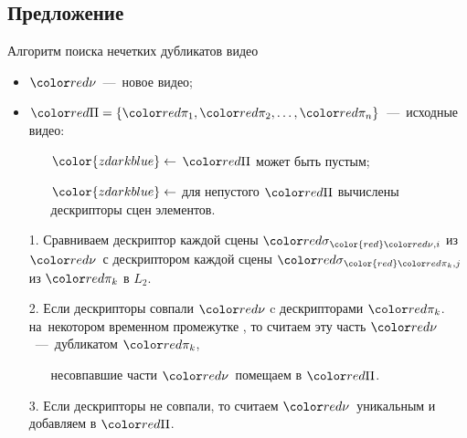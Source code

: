 
\subsection{Предложение}

\begin{frame}{Алгоритм поиска нечетких дубликатов видео}
    \begin{itemize} \footnotesize
        \item $\nv$\ ---~новое видео;
        \item $\setsv = \{\sv[1], \sv[2], \dots, \sv[n]\}$\ ---~исходные видео:
            \begin{itemize}
                \item[${\color{zdarkblue}\leftarrow}$]
                    {\scriptsize  $\setsv$ может быть пустым};
                \item[${\color{zdarkblue}\leftarrow}$]
                    {\scriptsize для непустого $\setsv$
                        вычислены дескрипторы сцен элементов.}
            \end{itemize}
        \item[1.] Сравниваем дескриптор каждой
            сцены $\videoshot_{\color{red}\nv,i}$ из $\nv$\
            с дескриптором каждой сцены
            $\videoshot_{\color{red}\sv[k],j}$ из $\sv[k]$ в $L_2$.
        \item[2.] Если дескрипторы совпали $\nv$ c дескрипторами $\sv[k]$.
            на~некотором временном промежутке ,
            то считаем эту часть $\nv$\ ---~дубликатом $\sv[k]$,
            \begin{itemize}
                \item[] {\scriptsize несовпавшие
                    части $\nv$\ помещаем в $\setsv$}.
            \end{itemize}
        \item[3.] Если дескрипторы не совпали, то считаем $\nv$\ уникальным и
            добавляем в $\setsv$.
    \end{itemize}
\end{frame}
